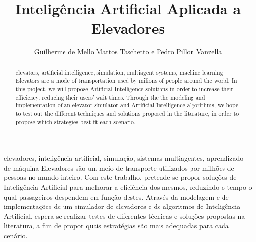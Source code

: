 \documentclass[portuguese,oneside]{tcc}
\author{Guilherme de Mello Mattos Taschetto e Pedro Pillon Vanzella}
\title{Inteligência Artificial Aplicada a Elevadores}
      {Artificial Intelligence Applied to Elevators}
\begin{document}
\begin{resumo}{elevadores, inteligência artificial, simulação, sistemas multiagentes, aprendizado de máquina}
Elevadores são um meio de transporte utilizados por milhões de pessoas no mundo
inteiro. Com este trabalho, pretende-se propor soluções de Inteligência
Artificial para melhorar a eficiência dos mesmos, reduzindo o tempo o qual
passageiros despendem em função destes. Através da modelagem e de implementações
de um simulador de elevadores e de algoritmos de Inteligência Artificial,
espera-se realizar testes de diferentes técnicas e soluções propostas na
literatura, a fim de propor quais estratégias são mais adequadas para cada
cenário.
\end{resumo}

\begin{abstract}{elevators, artificial intelligence, simulation, multiagent systems, machine learning}
  Elevators are a mode of transportation used by milions of people around the
  world. In this project, we will propose Artificial Intelligence solutions in
  order to increase their efficiency, reducing their users' wait times.
  Through the the modeling and implementation of an elevator simulator and
  Artificial Intelligence algorithms, we hope to test out the different
  techniques and solutions proposed in the literature, in order to propose which
  strategies best fit each scenario.
\end{abstract}

\tableofcontents










\end{document}
